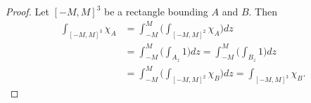 \documentclass[20pt]{article}
\theoremstyle{plain}
\theoremstyle{definition}
\begin{document}
\begin{proof}
  Let $[-M, M]^3$ be a rectangle bounding $A$ and $B$. Then 
  \begin{align}
    \int_{[-M, M]^3}\chi_A 
    &= \int_{-M}^M \bigg( \int_{[-M, M]^2} \chi_A \bigg)dz \\
    &= \int_{-M}^M \bigg( \int_{A_z} 1 \bigg) dz
    = \int_{-M}^M \bigg( \int_{B_z} 1 \bigg) dz \\
    &= \int_{-M}^M \bigg( \int_{[-M, M]^2} \chi_B \bigg)dz 
    = \int_{[-M, M]^3}\chi_B.
  \end{align}
\end{proof}
\end{document}
